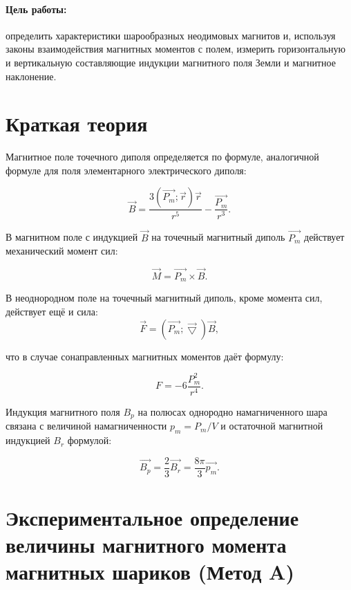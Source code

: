 





\paragraph{Цель работы:}определить характеристики шарообразных неодимовых магнитов и, используя
законы взаимодействия магнитных моментов с полем, измерить горизонтальную и вертикальную
составляющие индукции магнитного поля Земли и магнитное наклонение.
\section{Краткая теория}

Магнитное поле точечного диполя определяется по формуле, аналогичной формуле для поля
элементарного электрического диполя:

\begin{equation}
\vec{B} = \frac{3(\vec{P_m};\vec{r})\vec{r}}{r^5}-\frac{\vec{P_m}}{r^3}.
\end{equation}

В магнитном поле с индукцией $\vec{B}$ на точечный магнитный диполь $\vec{P_m}$ действует механический момент сил:


\begin{equation}
\vec{M} = \vec{P_m} \times \vec{B}.
\end{equation}

В неоднородном поле на точечный магнитный диполь, кроме момента сил, действует ещё и сила:
\begin{equation}
\vec{F} = (\vec{P_m};\vec{\bigtriangledown})\vec{B},
\end{equation}

что в случае сонаправленных магнитных моментов даёт формулу:

\begin{equation}
F = -6\frac{P_m^2}{r^4}.
\end{equation}

Индукция магнитного поля $B_p$ на полюсах однородно намагниченного шара связана с величиной намагниченности $p_m = P_m/V$
и остаточной магнитной индукцией $B_r$
формулой:

\[\vec{B_p} = \frac{2}{3} \vec{B_r} = \frac{8\pi}{3} \vec{p_m} .\]

\section{Экспериментальное определение величины магнитного момента магнитных шариков (Метод A)}

